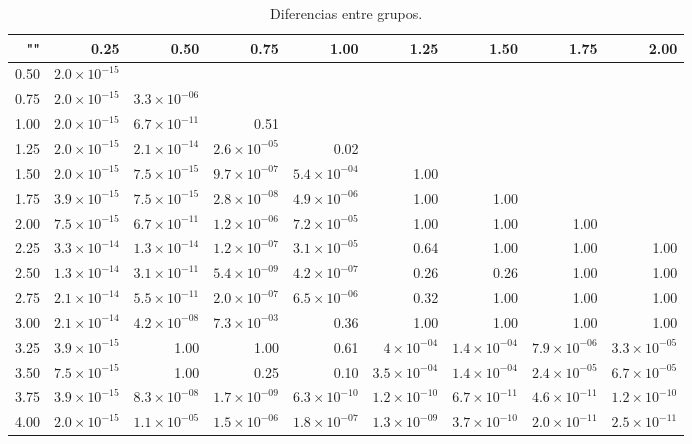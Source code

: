 \documentclass{article}
\begin{document}
\begin{table}[htb]
    \centering
    \caption{Diferencias entre grupos.} 
    \begin{tabular}{|r|r|r|r|r|r|r|r|r|}
    \hline
    "" & 0.25 & 0.50 & 0.75 & 1.00 & 1.25 & 1.50 & 1.75 & 2.00 \\
    \hline
    0.50 & $2.0\times 10^{-15}$ &  &  &  &  &  &  & \\
    \hline
    0.75 & $2.0\times 10^{-15}$ & $3.3\times 10^{-06}$ &  &  &  &  &  & \\
    \hline
    1.00 & $2.0\times 10^{-15}$ & $6.7\times 10^{-11}$ & 0.51 &  &  &  &  &  \\
    \hline
    1.25 & $2.0\times 10^{-15}$ & $2.1\times 10^{-14}$ & $2.6\times 10^{-05}$ & 0.02 &  &  &  &  \\
    \hline
    1.50 & $2.0\times 10^{-15}$ & $7.5\times 10^{-15}$ & $9.7\times 10^{-07}$ & $5.4\times 10^{-04}$ & 1.00 &  &  &  \\
    \hline
    1.75 & $3.9\times 10^{-15}$ & $7.5\times 10^{-15}$ & $2.8\times 10^{-08}$ & $4.9\times 10^{-06}$ & 1.00 & 1.00 &  &  \\
    \hline
    2.00 & $7.5\times 10^{-15}$ & $6.7\times 10^{-11}$ & $1.2\times 10^{-06}$ & $7.2\times 10^{-05}$ & 1.00 & 1.00 & 1.00 &  \\
    \hline
    2.25 & $3.3\times 10^{-14}$ & $1.3\times 10^{-14}$ & $1.2\times 10^{-07}$ & $3.1\times 10^{-05}$ & 0.64 & 1.00 & 1.00 & 1.00 \\
    \hline
    2.50 & $1.3\times 10^{-14}$ & $3.1\times 10^{-11}$ & $5.4\times 10^{-09}$ & $4.2\times 10^{-07}$ & 0.26 & 0.26 & 1.00 & 1.00 \\
    \hline
    2.75 & $2.1\times 10^{-14}$ & $5.5\times 10^{-11}$ & $2.0\times 10^{-07}$ & $6.5\times 10^{-06}$ & 0.32 & 1.00 & 1.00 & 1.00 \\
    \hline
    3.00 & $2.1\times 10^{-14}$ & $4.2\times 10^{-08}$ & $7.3\times 10^{-03}$ & 0.36 & 1.00 & 1.00 & 1.00 & 1.00 \\
    \hline
    3.25 & $3.9\times 10^{-15}$ & 1.00 & 1.00 & 0.61 & $4\times 10^{-04}$ & $1.4\times 10^{-04}$ & $7.9\times 10^{-06}$ & $3.3\times 10^{-05}$ \\
    \hline
    3.50 & $7.5\times 10^{-15}$ & 1.00 & 0.25 & 0.10 & $3.5\times 10^{-04}$ & $1.4\times 10^{-04}$ & $2.4\times 10^{-05}$ & $6.7\times 10^{-05}$ \\
    \hline
    3.75 & $3.9\times 10^{-15}$ & $8.3\times 10^{-08}$ & $1.7\times 10^{-09}$ & $6.3\times 10^{-10}$ & $1.2\times 10^{-10}$ & $6.7\times 10^{-11}$ & $4.6\times 10^{-11}$ & $1.2\times 10^{-10}$ \\
    \hline
    4.00 & $2.0\times 10^{-15}$ & $1.1\times 10^{-05}$ & $1.5\times 10^{-06}$ & $1.8\times 10^{-07}$ & $1.3\times 10^{-09}$ & $3.7\times 10^{-10}$ & $2.0\times 10^{-11}$ & $2.5\times 10^{-11}$ \\
    \hline
\end{tabular}
    \label{cuadro 4}
\end{table}
\end{document}
